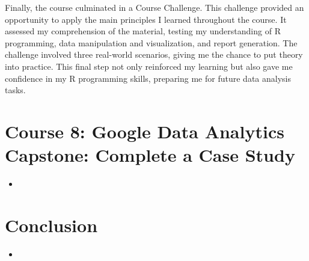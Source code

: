 \documentclass[]{article}
\begin{document}
Finally, the course culminated in a Course Challenge. This challenge provided an opportunity to apply the main principles I learned throughout the course. It assessed my comprehension of the material, testing my understanding of R programming, data manipulation and visualization, and report generation. The challenge involved three real-world scenarios, giving me the chance to put theory into practice. This final step not only reinforced my learning but also gave me confidence in my R programming skills, preparing me for future data analysis tasks.

\section{Course 8: Google Data Analytics Capstone: Complete a Case Study}
\begin{itemize}
  \item
\end{itemize}
\section{Conclusion}
\begin{itemize}
  \item
\end{itemize}
\end{document}
